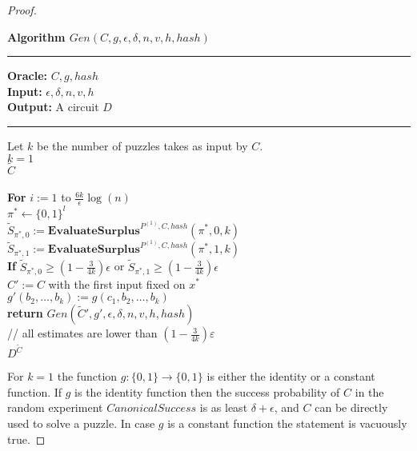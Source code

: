\begin{proof}
\begin{codeblock}
\end{codeblock}
%
%
\begin{codeblock}
  \textbf{Algorithm $Gen(C, g, \epsilon, \delta, n, v, h, hash)$}
  \medskip
  \hrule
  \medskip
  \textbf{Oracle:} $C, g, hash$ \\
  \textbf{Input:}  $\epsilon, \delta, n, v, h$\\
  \textbf{Output:} A circuit $D$
  \medskip\hrule\medskip
  Let $k$ be the number of puzzles takes as input by $C$.\\
  \If $k = 1$ \then \\
  \IndI \return $\widetilde{C}$ \\ \\
  \textbf{For} $i:=1$ to $\frac{6k}{\epsilon}\log(n)$ \\
  \IndI $\pi^* \leftarrow \{0,1\}^{l}$\\
  \IndI $\widetilde{S}_{\pi^*,0} := \textbf{EvaluateSurplus}^{P^{(1)}, C, hash}(\pi^*, 0, k)$\\
  \IndI $\widetilde{S}_{\pi^*,1} := \textbf{EvaluateSurplus}^{P^{(1)}, C, hash}(\pi^*, 1, k)$\\
  \IndI \textbf{If} $\widetilde{S}_{\pi^*,0} \geq (1 - \frac{3}{4k}) \epsilon$ or $\widetilde{S}_{\pi^*,1} \geq (1 - \frac{3}{4k}) \epsilon$ \\
  \IndII $C' := C$ with the first input fixed on $x^*$\\
  \IndII $g'(b_2, \dots, b_k) := g(c_1, b_2, \dots, b_k)$\\
  \IndII\textbf{return} $Gen(\widetilde{C}', g', \epsilon, \delta, n, v, h, hash)$ \\
  // all estimates are lower than $(1-\frac{3}{4k})\varepsilon$\\
  \return $D^{\widetilde{C}}$
\end{codeblock}
%
%
For $k=1$ the function $g: \{0,1\} \rightarrow \{0,1\}$ is either the identity or a constant function.
If $g$ is the identity function then the success probability of $C$ in the random experiment $CanonicalSuccess$ is as least $\delta + \epsilon$,
and $C$ can be directly used to solve a puzzle. In case $g$ is a constant function the statement is vacuously true.


\end{proof}
